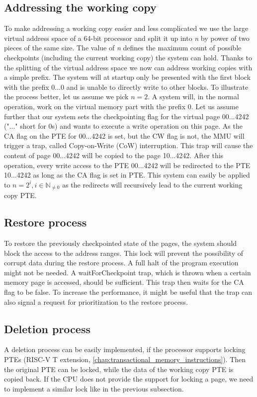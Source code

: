 \subsection{Addressing the working copy}
To make addressing a working copy easier and less complicated
we use the large virtual address space of a 64-bit processor
and split it up into \textit{n} by power of two pieces of the same size.
The value of \textit{n} defines the maximum count of possible checkpoints
(including the current working copy) the system can hold.
Thanks to the splitting of the virtual address space we now
can address working copies with a simple prefix.
The system will at startup only be presented with the first
block with the prefix 0...0 and is unable to directly
write to other blocks.
To illustrate the process better, let us assume we pick $n=2$.
A system will, in the normal operation,
work on the virtual memory part with the prefix 0. Let us assume
further that our system sets the checkpointing flag for the virtual
page 00...4242 ("..." short for 0s) and wants to execute
a write operation on this page.
As the CA flag on the PTE for 00...4242 is set, but the CW flag
is not, the MMU will trigger a trap, 
called Copy-on-Write (CoW) interruption.
This trap will cause the content of page 00...4242
will be copied to the page 10...4242. After this operation, 
every write access to the PTE 00...4242 will be redirected to
the PTE 10...4242 as long as the CA flag is set in PTE.
This system can easily be applied to $n=2^i,i \in \mathbb{N}_{\ne 0}$
as the redirects will recursively lead to the current working
copy PTE.

\subsection{Restore process}
To restore the previously checkpointed state of the pages,
the system should block the access to the address ranges.
This lock will prevent the possibility of corrupt data during
the restore process. A full halt of the program execution
might not be needed. A waitForCheckpoint trap, 
which is thrown when a certain memory page is accessed,
should be sufficient. This trap then waits for the
CA flag to be false. To increase the performance,
it might be useful that the trap can also signal a
request for prioritization to the restore process.

\subsection{Deletion process}
A deletion process can be easily implemented, if the
processor supports locking PTEs
(RISC-V T extension, \ref{chap:transactional_memory_instructions}).
Then the original PTE can be locked, while the
data of the working copy PTE is copied back.
If the CPU does not provide the support for
locking a page, we need to implement a similar
lock like in the previous subsection.

